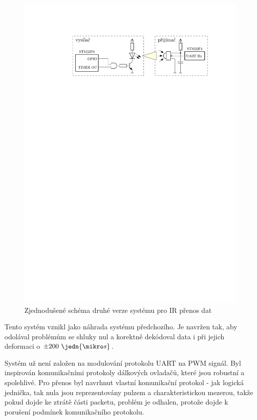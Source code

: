 \begin{figure}[H]
    \begin{center}
        \includegraphics[width=\textwidth]{img/ir-system}
    \end{center}
    \caption{Zjednodušené schéma druhé verze systému pro IR přenos dat}
\end{figure}

Tento systém vznikl jako náhrada systému předchozího. Je navržen tak, aby odolával problémům se shluky nul a korektně dekódoval data i při jejich deformaci o $\pm200~\jedn{\mikro s}$.

Systém už není založen na modulování protokolu UART na PWM signál. Byl inspirován komunikačními protokoly dálkových ovladačů, které jsou robustní a spolehlivé. Pro přenos byl navrhnut vlastní komunikační protokol - jak logická jednička, tak nula jsou reprezentovány pulzem a charakteristickou mezerou, takže pokud dojde ke ztrátě části packetu, problém je odhalen, protože dojde k porušení podmínek komunikačního protokolu.

